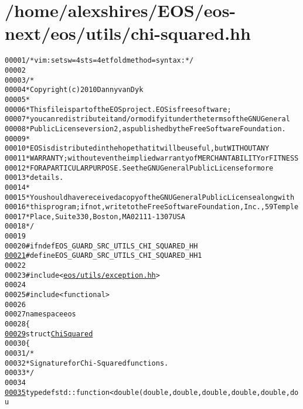 \hypertarget{chi-squared_8hh_source}{
\section{/home/alexshires/EOS/eos-\/next/eos/utils/chi-\/squared.hh}
}


\begin{footnotesize}\begin{alltt}
00001 \textcolor{comment}{/* vim: set sw=4 sts=4 et foldmethod=syntax : */}
00002 
00003 \textcolor{comment}{/*}
00004 \textcolor{comment}{ * Copyright (c) 2010 Danny van Dyk}
00005 \textcolor{comment}{ *}
00006 \textcolor{comment}{ * This file is part of the EOS project. EOS is free software;}
00007 \textcolor{comment}{ * you can redistribute it and/or modify it under the terms of the GNU General}
00008 \textcolor{comment}{ * Public License version 2, as published by the Free Software Foundation.}
00009 \textcolor{comment}{ *}
00010 \textcolor{comment}{ * EOS is distributed in the hope that it will be useful, but WITHOUT ANY}
00011 \textcolor{comment}{ * WARRANTY; without even the implied warranty of MERCHANTABILITY or FITNESS}
00012 \textcolor{comment}{ * FOR A PARTICULAR PURPOSE.  See the GNU General Public License for more}
00013 \textcolor{comment}{ * details.}
00014 \textcolor{comment}{ *}
00015 \textcolor{comment}{ * You should have received a copy of the GNU General Public License along with}
00016 \textcolor{comment}{ * this program; if not, write to the Free Software Foundation, Inc., 59 Temple}
00017 \textcolor{comment}{ * Place, Suite 330, Boston, MA  02111-1307  USA}
00018 \textcolor{comment}{ */}
00019 
00020 \textcolor{preprocessor}{#ifndef EOS\_GUARD\_SRC\_UTILS\_CHI\_SQUARED\_HH}
\hypertarget{chi-squared_8hh_source_l00021}{}\hyperlink{chi-squared_8hh_ae30f53ca6bf69d4e5c12f08df13686f1}{00021} \textcolor{preprocessor}{}\textcolor{preprocessor}{#define EOS\_GUARD\_SRC\_UTILS\_CHI\_SQUARED\_HH 1}
00022 \textcolor{preprocessor}{}
00023 \textcolor{preprocessor}{#include <\hyperlink{exception_8hh}{eos/utils/exception.hh}>}
00024 
00025 \textcolor{preprocessor}{#include <functional>}
00026 
00027 \textcolor{keyword}{namespace }eos
00028 \{
\hypertarget{chi-squared_8hh_source_l00029}{}\hyperlink{structeos_1_1ChiSquared}{00029}     \textcolor{keyword}{struct }\hyperlink{structeos_1_1ChiSquared}{ChiSquared}
00030     \{
00031         \textcolor{comment}{/*}
00032 \textcolor{comment}{         * Signature for Chi-Squared functions.}
00033 \textcolor{comment}{         */}
00034 
\hypertarget{chi-squared_8hh_source_l00035}{}\hyperlink{structeos_1_1ChiSquared_a27e9ed6fbc17e90137b66be99d417462}{00035}         \textcolor{keyword}{typedef} std::function<double (double, double, double, double, double, dou

\end{alltt}
\end{footnotesize}
